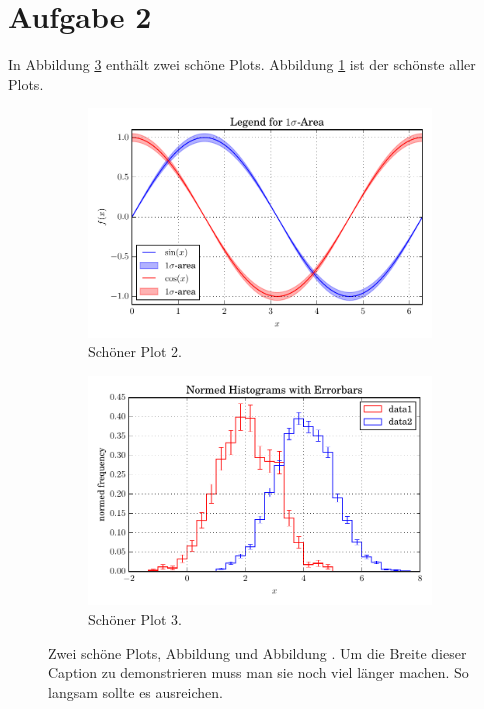 \documentclass[
  captions=tableheading,
]{scrartcl}
\begin{document}
\section*{Aufgabe 2}
In Abbildung \ref{fig:subfigs} enthält zwei schöne Plots.
Abbildung \ref{fig:plot2} ist der schönste aller Plots.
\begin{figure}
  \centering
  \begin{subfigure}{0.48\textwidth}
    \centering
    \includegraphics[width=\textwidth]{plot2.pdf}
    \caption{Schöner Plot 2.}
    \label{fig:plot2}
  \end{subfigure}
  \begin{subfigure}{0.48\textwidth}
    \centering
    \includegraphics[width=\textwidth]{plot3.pdf}
    \caption{Schöner Plot 3.}
    \label{fig:plot3}
  \end{subfigure}
  \caption{
    Zwei schöne Plots, Abbildung  und Abbildung .
    Um die Breite dieser Caption zu demonstrieren muss man sie noch viel länger machen. 
    So langsam sollte es ausreichen.
  }
  \label{fig:subfigs}
\end{figure}
\end{document}
